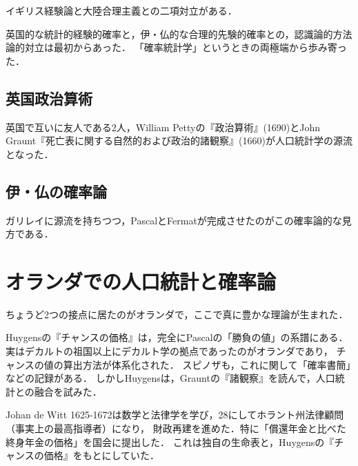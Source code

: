 \documentclass[uplatex,dvipdfmx]{jsreport}
\begin{document}
\begin{tcolorbox}[colframe=ForestGreen, colback=ForestGreen!10!white,breakable,colbacktitle=ForestGreen!40!white,coltitle=black,fonttitle=\bfseries\sffamily,
title=]
    イギリス経験論と大陸合理主義との二項対立がある．

    英国的な統計的経験的確率と，伊・仏的な合理的先験的確率との，認識論的方法論的対立は最初からあった．
    「確率統計学」というときの両極端から歩み寄った．
\end{tcolorbox}

\subsection{英国政治算術}

英国で互いに友人である2人，William Pettyの『政治算術』(1690)とJohn Graunt『死亡表に関する自然的および政治的諸観察』(1660)が人口統計学の源流となった．

\subsection{伊・仏の確率論}

ガリレイに源流を持ちつつ，PascalとFermatが完成させたのがこの確率論的な見方である．

\section{オランダでの人口統計と確率論}

\begin{tcolorbox}[colframe=ForestGreen, colback=ForestGreen!10!white,breakable,colbacktitle=ForestGreen!40!white,coltitle=black,fonttitle=\bfseries\sffamily,
title=]
    ちょうど2つの接点に居たのがオランダで，ここで真に豊かな理論が生まれた．
\end{tcolorbox}

Huygensの『チャンスの価格』は，完全にPascalの「勝負の値」の系譜にある．
実はデカルトの祖国以上にデカルト学の拠点であったのがオランダであり，
チャンスの値の算出方法が体系化された．
スピノザも，これに関して「確率書簡」などの記録がある．
しかしHuygensは，Grauntの『諸観察』を読んで，人口統計との融合を試みた．

Johan de Witt 1625-1672は数学と法律学を学び，28にしてホラント州法律顧問（事実上の最高指導者）になり，
財政再建を進めた．特に「償還年金と比べた終身年金の価格」を国会に提出した．
これは独自の生命表と，Huygensの『チャンスの価格』をもとにしていた．
\end{document}
